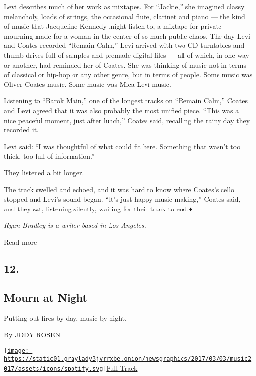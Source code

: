 Levi describes much of her work as mixtapes. For ``Jackie,'' she
imagined classy melancholy, loads of strings, the occasional flute,
clarinet and piano --- the kind of music that Jacqueline Kennedy might
listen to, a mixtape for private mourning made for a woman in the center
of so much public chaos. The day Levi and Coates recorded ``Remain
Calm,'' Levi arrived with two CD turntables and thumb drives full of
samples and premade digital files --- all of which, in one way or
another, had reminded her of Coates. She was thinking of music not in
terms of classical or hip-hop or any other genre, but in terms of
people. Some music was Oliver Coates music. Some music was Mica Levi
music.

Listening to ``Barok Main,'' one of the longest tracks on ``Remain
Calm,'' Coates and Levi agreed that it was also probably the most
unified piece. ``This was a nice peaceful moment, just after lunch,''
Coates said, recalling the rainy day they recorded it.

Levi said: ``I was thoughtful of what could fit here. Something that
wasn't too thick, too full of information.''

They listened a bit longer.

The track swelled and echoed, and it was hard to know where Coates's
cello stopped and Levi's sound began. ``It's just happy music making,''
Coates said, and they sat, listening silently, waiting for their track
to end.♦

\emph{Ryan Bradley is a writer based in Los Angeles.}

Read more

\hypertarget{12}{%
\subsection{12.}\label{12}}

\hypertarget{--mourn-at-night}{%
\subsection{\texorpdfstring{ Mourn at
Night}{  Mourn at Night}}\label{--mourn-at-night}}

Putting out fires by day, music by night.

By JODY ROSEN

\href{https://open.spotify.com/track/6zao3czBFKk1zbmIe3azJd}{\texttt{[image: https://static01.graylady3jvrrxbe.onion/newsgraphics/2017/03/03/music2017/assets/icons/spotify.svg]}Full
Track}

